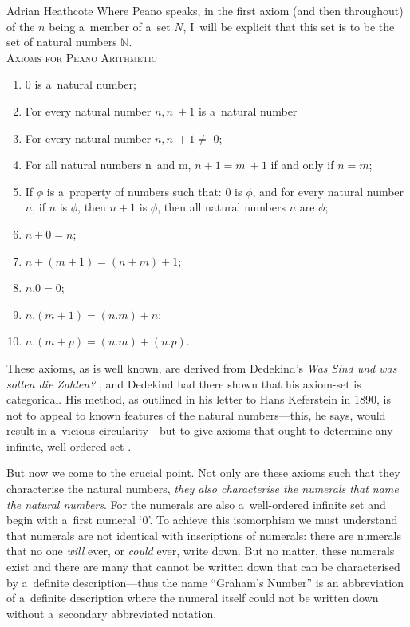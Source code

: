 \begin{artengenv}{Adrian Heathcote}
Where Peano speaks, in the first axiom (and then throughout) of the $n$ being a~member of a~set $N$, I~will be explicit that this set is to be the set of natural numbers $\mathbb{N}$. \\

\noindent\textsc{Axioms for Peano Arithmetic}

\begin{enumerate}[label=P\Roman* :]

  \item 0 is a~natural number;
  
  \item For every natural number $n, n~+ 1$ is a~natural number
  
  \item For every natural number $n, n~+ 1 \neq$ 0;
  
  \item For all natural numbers n~and m, $n + 1 = m~+ 1$ if and only if $n = m$;
  
  \item If $\phi$ is a~property of numbers such that: 0 is $\phi$, and for every natural number $n$, if $n$ is $\phi$, then $n + 1$ is $\phi$, then all natural numbers $n$ are $\phi$;
  
  \item $n + 0 = n$;
  
  \item $n + (m + 1) = (n + m) + 1$;
  
  \item $n . 0 = 0$;
  
  \item $n . (m + 1) =  (n . m) + n$;
  
  \item $n . (m + p) = (n . m) + (n . p)$.\\
\end{enumerate}

These axioms, as is well known, are derived from Dedekind's \textit{Was Sind und was sollen die Zahlen?} \parencite*{dedekind_was_1888}, and Dedekind had there shown that his axiom-set is categorical. His method, as outlined in his letter to Hans Keferstein in 1890, is not to appeal to known features of the natural numbers---this, he says, would result in a~vicious circularity---but to give axioms that ought to determine any infinite, well-ordered set \parencite{van_heijenoort_frege_1967}.

But now we come to the crucial point. Not only are these axioms such that they characterise the natural numbers, \emph{they also characterise the numerals that \emph{name} the natural numbers}. For the numerals are also a~well-ordered infinite set and begin with a~first numeral `0'. To achieve this isomorphism we must understand that numerals are not identical with inscriptions of numerals: there are numerals that no one \textit{will} ever, or \textit{could} ever, write down. But no matter, these numerals exist and there are many that cannot be written down that can be characterised by a~definite description---thus the name ``Graham's Number'' is an abbreviation of a~definite description where the numeral itself could not be written down without a~secondary abbreviated notation. 


\end{artengenv}
